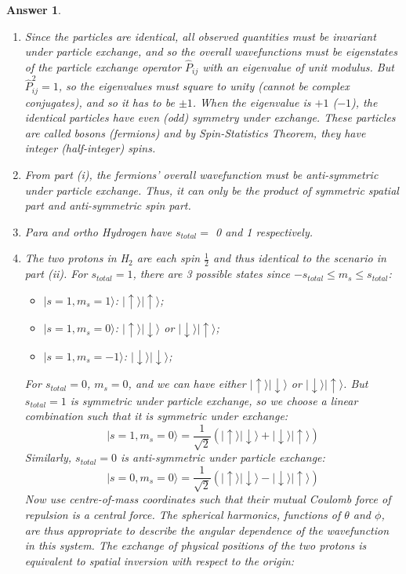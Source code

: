 \documentclass[a4paper]{article}
\newtheorem{ans}{Answer}[subsection]
\theoremstyle{new}
\begin{document}
\begin{ans}\leavevmode
\begin{enumerate}[label=(\roman*)]
\item Since the particles are identical, all observed quantities must be invariant under particle exchange, and so the overall wavefunctions must be eigenstates of the particle exchange operator $\hat{P}_{ij}$ with an eigenvalue of unit modulus. But $\hat{P}_{ij}^2=1$, so the eigenvalues must square to unity (cannot be complex conjugates), and so it has to be $\pm1$. When the eigenvalue is $+1$ ($-1$), the identical particles have even (odd) symmetry under exchange. These particles are called bosons (fermions) and by Spin-Statistics Theorem, they have integer (half-integer) spins.
\item From part (i), the fermions' overall wavefunction must be anti-symmetric under particle exchange. Thus, it can only be the product of symmetric spatial part and anti-symmetric spin part.
\item Para and ortho Hydrogen have $s_{total}=$ 0 and 1 respectively.
\item The two protons in H$_2$ are each spin $\frac{1}{2}$ and thus identical to the scenario in part (ii). For $s_{total}=1$, there are 3 possible states since $-s_{total}\leq m_s\leq s_{total}$:
\begin{itemize}
    \item $|s=1,m_s=1\rangle$: $|\uparrow\rangle|\uparrow\rangle$;
    \item $|s=1,m_s=0\rangle$: $|\uparrow\rangle|\downarrow\rangle$ or $|\downarrow\rangle|\uparrow\rangle$;
    \item $|s=1,m_s=-1\rangle$: $|\downarrow\rangle|\downarrow\rangle$;
\end{itemize}
For $s_{total}=0$, $m_s=0$, and we can have either $|\uparrow\rangle|\downarrow\rangle$ or $|\downarrow\rangle|\uparrow\rangle$. But $s_{total}=1$ is symmetric under particle exchange, so we choose a linear combination such that it is symmetric under exchange:
$$|s=1,m_s=0\rangle=\frac{1}{\sqrt{2}}(|\uparrow\rangle|\downarrow\rangle+|\downarrow\rangle|\uparrow\rangle)$$
Similarly, $s_{total}=0$ is anti-symmetric under particle exchange:
$$|s=0,m_s=0\rangle=\frac{1}{\sqrt{2}}(|\uparrow\rangle|\downarrow\rangle-|\downarrow\rangle|\uparrow\rangle)$$
Now use centre-of-mass coordinates such that their mutual Coulomb force of repulsion is a central force. The spherical harmonics, functions of $\theta$ and $\phi$, are thus appropriate to describe the angular dependence of the wavefunction in this system. The exchange of physical positions of the two protons is equivalent to spatial inversion with respect to the origin:

\end{enumerate}
\end{ans}
\end{document}
